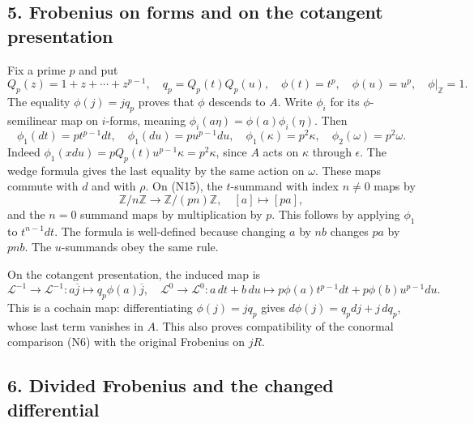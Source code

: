 \documentclass[
]{article}
\begin{document}
\subsection{5. Frobenius on forms and on the cotangent
presentation}\label{frobenius-on-forms-and-on-the-cotangent-presentation}

Fix a prime \(p\) and put \[
Q_p(z)=1+z+\cdots+z^{p-1},\quad q_p=Q_p(t)Q_p(u),
\quad\phi(t)=t^p,\quad\phi(u)=u^p,\quad\phi|_{\mathbb Z}=1.
\tag{N16}
\] The equality \(\phi(j)=jq_p\) proves that \(\phi\) descends to \(A\).
Write \(\phi_i\) for its \(\phi\)-semilinear map on \(i\)-forms, meaning
\(\phi_i(a\eta)=\phi(a)\phi_i(\eta)\). Then \[
\phi_1(dt)=p t^{p-1}dt,\quad
\phi_1(du)=p u^{p-1}du,\quad
\phi_1(\kappa)=p^2\kappa,\quad
\phi_2(\omega)=p^2\omega.
\tag{N17}
\] Indeed \(\phi_1(xdu)=pQ_p(t)u^{p-1}\kappa=p^2\kappa\), since \(A\)
acts on \(\kappa\) through \(\epsilon\). The wedge formula gives the
last equality by the same action on \(\omega\). These maps commute with
\(d\) and with \(\rho\). On (N15), the \(t\)-summand with index
\(n\ne0\) maps by \[
\mathbb Z/n\mathbb Z\longrightarrow\mathbb Z/(pn)\mathbb Z,
\quad [a]\longmapsto[pa],
\tag{N18}
\] and the \(n=0\) summand maps by multiplication by \(p\). This follows
by applying \(\phi_1\) to \(t^{n-1}dt\). The formula is well-defined
because changing \(a\) by \(nb\) changes \(pa\) by \(pnb\). The
\(u\)-summands obey the same rule.

On the cotangent presentation, the induced map is \[
\mathcal L^{-1}\to\mathcal L^{-1}:a\overline j\longmapsto q_p\phi(a)\overline j,
\quad
\mathcal L^0\to\mathcal L^0:
a\,dt+b\,du\longmapsto p\phi(a)t^{p-1}dt+p\phi(b)u^{p-1}du.
\tag{N19}
\] This is a cochain map: differentiating \(\phi(j)=jq_p\) gives
\(d\phi(j)=q_p dj+j\,dq_p\), whose last term vanishes in \(A\). This
also proves compatibility of the conormal comparison (N6) with the
original Frobenius on \(jR\).

\subsection{6. Divided Frobenius and the changed
differential}\label{divided-frobenius-and-the-changed-differential}
\end{document}
